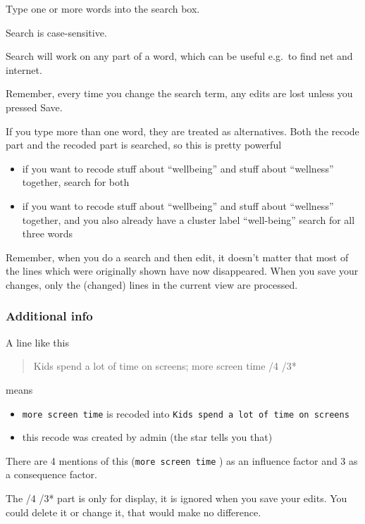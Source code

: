 \documentclass[
]{book}
\providecommand{\tightlist}{%
  \setlength{\itemsep}{0pt}\setlength{\parskip}{0pt}}
\begin{document}
Type one or more words into the search box.

Search is case-sensitive.

Search will work on any part of a word, which can be useful e.g.~to find net and internet.

Remember, every time you change the search term, any edits are lost unless you pressed Save.

If you type more than one word, they are treated as alternatives. Both the recode part and the recoded part is searched, so this is pretty powerful

\begin{itemize}
\tightlist
\item
  if you want to recode stuff about ``wellbeing'' and stuff about ``wellness'' together, search for both
\item
  if you want to recode stuff about ``wellbeing'' and stuff about ``wellness'' together, and you also already have a cluster label ``well-being'' search for all three words
\end{itemize}

Remember, when you do a search and then edit, it doesn't matter that most of the lines which were originally shown have now disappeared. When you save your changes, only the (changed) lines in the current view are processed.

\hypertarget{additional-info}{%
\subsubsection{Additional info}\label{additional-info}}

A line like this

\begin{quote}
Kids spend a lot of time on screens; more screen time /4 /3*
\end{quote}

means

\begin{itemize}
\tightlist
\item
  \texttt{more\ screen\ time} is recoded into \texttt{Kids\ spend\ a\ lot\ of\ time\ on\ screens}
\item
  this recode was created by admin (the star tells you that)
\end{itemize}

There are 4 mentions of this (\texttt{more\ screen\ time} ) as an influence factor and 3 as a consequence factor.

The /4 /3* part is only for display, it is ignored when you save your edits. You could delete it or change it, that would make no difference.
\end{document}
